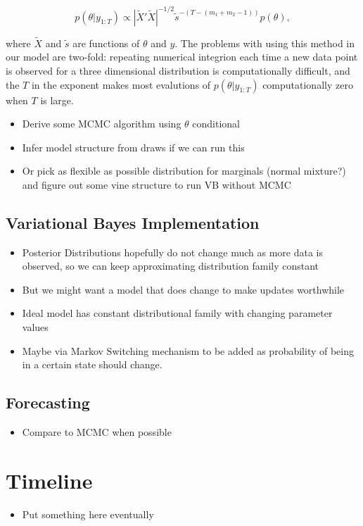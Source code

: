 \documentclass{article}\usepackage[]{graphicx}\usepackage[]{color}
\numberwithin{equation}{section}
\begin{document}
\begin{equation}
\label{exp-sm-marginal}
p(\theta | y_{1:T}) \propto \left| \widetilde{X}' \widetilde{X} \right|^{-1/2} \tilde{s}^{-(T-(m_1 + m_2 - 1))} p(\theta),
\end{equation}

where $\widetilde{X}$ and $\tilde{s}$ are functions of $\theta$ and $y$. The problems with using this method in our model are two-fold: repeating numerical integrion each time a new data point is observed for a three dimensional distribution is computationally difficult, and the $T$ in the exponent makes most evalutions of $p(\theta | y_{1:T})$ computationally zero when $T$ is large.

\begin{itemize}
\item Derive some MCMC algorithm using $\theta$ conditional
\item Infer model structure from draws if we can run this
\item Or pick as flexible as possible distribution for marginals (normal mixture?) and figure out some vine structure to run VB without MCMC
\end{itemize}

\subsection{Variational Bayes Implementation}
\begin{itemize}
\item Posterior Distributions hopefully do not change much as more data is observed, so we can keep approximating distribution family constant
\item But we might want a model that does change to make updates worthwhile
\item Ideal model has constant distributional family with changing parameter values
\item Maybe via Markov Switching mechanism to be added as probability of being in a certain state should change.
\end{itemize}
\subsection{Forecasting}

\begin{itemize}
\item Compare to MCMC when possible
\end{itemize}

\section{Timeline}
\begin{itemize}
\item Put something here eventually
\end{itemize}



\end{document}
